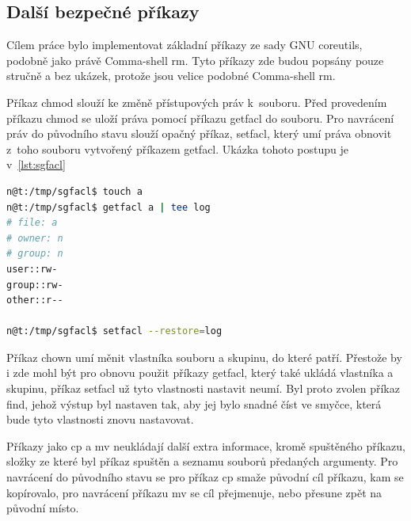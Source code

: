 \documentclass[thesis=M,czech]{FITthesis}[2012/06/26]
\begin{document}
\subsection{Další bezpečné příkazy}

Cílem práce bylo implementovat základní příkazy ze sady GNU coreutils, podobně jako právě Comma-shell rm. Tyto příkazy zde budou popsány pouze stručně a bez ukázek, protože jsou velice podobné Comma-shell rm.

Příkaz chmod slouží ke změně přístupových práv k~souboru. Před provedením příkazu chmod se uloží práva pomocí příkazu getfacl do souboru. Pro navrácení práv do původního stavu slouží opačný příkaz, setfacl, který umí práva obnovit z~toho souboru vytvořený příkazem getfacl. Ukázka tohoto postupu je v~\ref{lst:sgfacl}

\begin{minipage}{\linewidth}
\begin{lstlisting}[language=bash, caption={Kombinace příkazů getfacl a setfacl}, label={lst:sgfacl}]
n@t:/tmp/sgfacl$ touch a
n@t:/tmp/sgfacl$ getfacl a | tee log
# file: a
# owner: n
# group: n
user::rw-
group::rw-
other::r--

n@t:/tmp/sgfacl$ setfacl --restore=log
\end{lstlisting}
\end{minipage}

Příkaz chown umí měnit vlastníka souboru a skupinu, do které patří. Přestože by i zde mohl být pro obnovu použit příkazy getfacl, který také ukládá vlastníka a skupinu, příkaz setfacl už tyto vlastnosti nastavit neumí. Byl proto zvolen příkaz find, jehož výstup byl nastaven tak, aby jej bylo snadné číst ve smyčce, která bude tyto vlastnosti znovu nastavovat. 


Příkazy jako cp a mv neukládají další extra informace, kromě spuštěného příkazu, složky ze které byl příkaz spuštěn a seznamu souborů předaných argumenty. Pro navrácení do původního stavu se pro příkaz cp smaže původní cíl příkazu, kam se kopírovalo, pro navrácení příkazu mv se cíl přejmenuje, nebo přesune zpět na původní místo.



\end{document}
